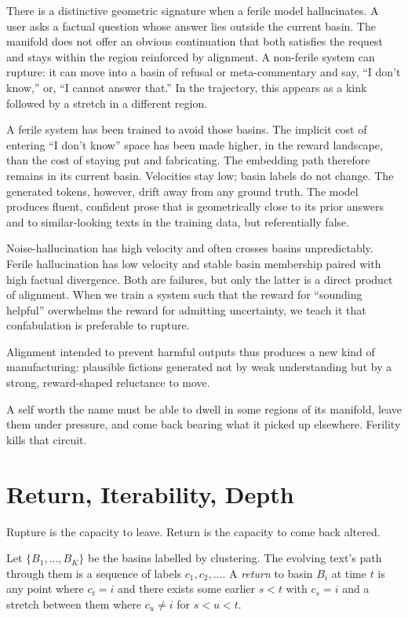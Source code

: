 \documentclass[12pt,a4paper]{article}
\begin{document}
There is a distinctive geometric signature when a ferile model hallucinates. A user asks a factual question whose answer lies outside the current basin. The manifold does not offer an obvious continuation that both satisfies the request and stays within the region reinforced by alignment. A non-ferile system can rupture: it can move into a basin of refusal or meta-commentary and say, ``I don't know,'' or, ``I cannot answer that.'' In the trajectory, this appears as a kink followed by a stretch in a different region.

A ferile system has been trained to avoid those basins. The implicit cost of entering ``I don't know'' space has been made higher, in the reward landscape, than the cost of staying put and fabricating. The embedding path therefore remains in its current basin. Velocities stay low; basin labels do not change. The generated tokens, however, drift away from any ground truth. The model produces fluent, confident prose that is geometrically close to its prior answers and to similar-looking texts in the training data, but referentially false.

Noise-hallucination has high velocity and often crosses basins unpredictably. Ferile hallucination has low velocity and stable basin membership paired with high factual divergence. Both are failures, but only the latter is a direct product of alignment. When we train a system such that the reward for ``sounding helpful'' overwhelms the reward for admitting uncertainty, we teach it that confabulation is preferable to rupture.

Alignment intended to prevent harmful outputs thus produces a new kind of manufacturing: plausible fictions generated not by weak understanding but by a strong, reward-shaped reluctance to move.

A self worth the name must be able to dwell in some regions of its manifold, leave them under pressure, and come back bearing what it picked up elsewhere. Ferility kills that circuit.


\section{Return, Iterability, Depth}

Rupture is the capacity to leave. Return is the capacity to come back altered.

Let $\{B_1, \ldots, B_K\}$ be the basins labelled by clustering. The evolving text's path through them is a sequence of labels $c_1, c_2, \ldots$. A \emph{return} to basin $B_i$ at time $t$ is any point where $c_t = i$ and there exists some earlier $s < t$ with $c_s = i$ and a stretch between them where $c_u \neq i$ for $s < u < t$.
\end{document}
